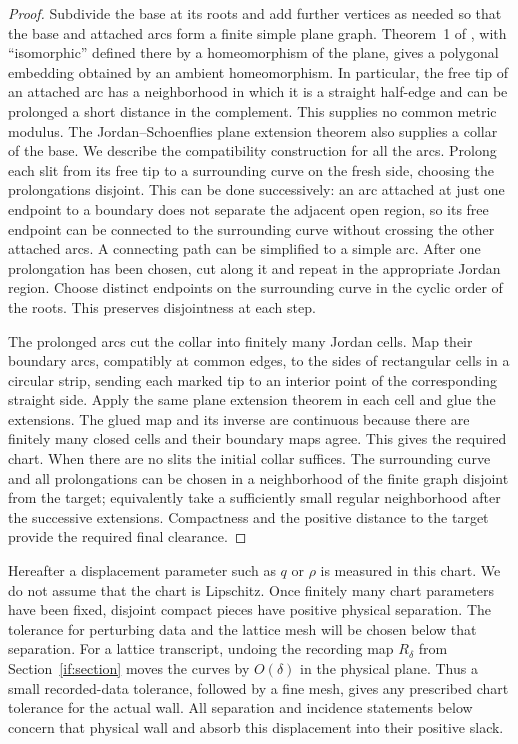 \begin{proof}
Subdivide the base at its roots and add further vertices as needed
so that the base and attached arcs form a finite simple plane graph.
Theorem~1 of \cite{Schaefer2021}, with ``isomorphic'' defined there
by a homeomorphism of the plane, gives a polygonal embedding obtained
by an ambient homeomorphism.  In particular, the free tip of an attached
arc has a neighborhood in which it is a straight half-edge and can
be prolonged a short distance in the complement.  This supplies no
common metric modulus.  The Jordan--Schoenflies plane extension
theorem \cite[Section~10, Theorem~4]{Moise1977} also supplies a collar of the
base.  We describe the compatibility construction for all the arcs.
Prolong each slit from
its free tip to a surrounding curve on the fresh side, choosing the
prolongations disjoint.  This can be done successively: an arc attached
at just one endpoint to a boundary does not separate the adjacent open
region, so its free endpoint can be connected to the surrounding curve
without crossing the other attached arcs.  A connecting path can be
simplified to a simple arc.  After one prolongation has been chosen,
cut along it and repeat in the appropriate Jordan region.  Choose
distinct endpoints on the surrounding curve in the cyclic order of
the roots.  This preserves disjointness at each step.

The prolonged arcs cut the collar into finitely many Jordan cells.
Map their boundary arcs, compatibly at common edges, to the sides of
rectangular cells in a circular strip, sending each marked tip to an
interior point of the corresponding straight side.  Apply the same
plane extension theorem in each cell and glue the extensions.
The glued map and its inverse are continuous because there are
finitely many closed cells and their boundary maps agree.  This gives
the required chart.  When there are no slits the initial collar
suffices.  The surrounding curve and all prolongations can be chosen
in a neighborhood of the finite graph disjoint from the target;
equivalently take a sufficiently small regular neighborhood after
the successive extensions.  Compactness and the positive distance
to the target provide the required final clearance.
\end{proof}

Hereafter a displacement parameter such as $q$ or $\rho$ is measured in
this chart.  We do not assume that the chart is Lipschitz.  Once finitely
many chart parameters have been fixed, disjoint compact pieces have
positive physical separation.  The tolerance for perturbing data and
the lattice mesh will be chosen below that separation. For a lattice
transcript, undoing the recording map $R_\delta$ from
Section~\ref{if:section} moves the curves by $O(\delta)$ in the
physical plane. Thus a small recorded-data tolerance, followed by a
fine mesh, gives any prescribed chart tolerance for the actual wall.
All separation and incidence statements below concern that physical
wall and absorb this displacement into their positive slack.

